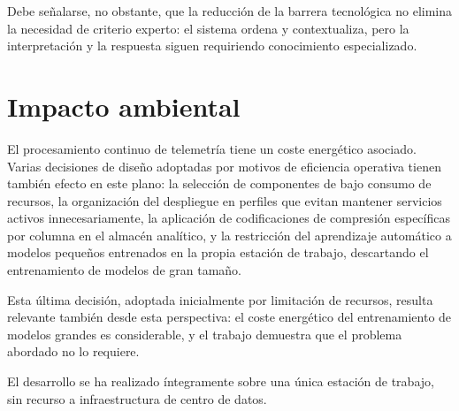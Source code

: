 Debe señalarse, no obstante, que la reducción de la barrera tecnológica no elimina la
necesidad de criterio experto: el sistema ordena y contextualiza, pero la interpretación y la
respuesta siguen requiriendo conocimiento especializado.

\section{Impacto ambiental}

El procesamiento continuo de telemetría tiene un coste energético asociado. Varias decisiones
de diseño adoptadas por motivos de eficiencia operativa tienen también efecto en este plano:
la selección de componentes de bajo consumo de recursos, la organización del despliegue en
perfiles que evitan mantener servicios activos innecesariamente, la aplicación de
codificaciones de compresión específicas por columna en el almacén analítico, y la
restricción del aprendizaje automático a modelos pequeños entrenados en la propia estación
de trabajo, descartando el entrenamiento de modelos de gran tamaño.

Esta última decisión, adoptada inicialmente por limitación de recursos, resulta relevante
también desde esta perspectiva: el coste energético del entrenamiento de modelos grandes es
considerable, y el trabajo demuestra que el problema abordado no lo requiere.

El desarrollo se ha realizado íntegramente sobre una única estación de trabajo, sin recurso a
infraestructura de centro de datos.
